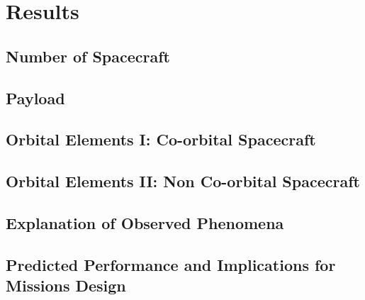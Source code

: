 \chapter{Results}

\section{Number of Spacecraft}

\section{Payload}

\section{Orbital Elements I: Co-orbital Spacecraft}

\section{Orbital Elements II: Non Co-orbital Spacecraft}

\section{Explanation of Observed Phenomena}

\section{Predicted Performance and Implications for Missions Design}
